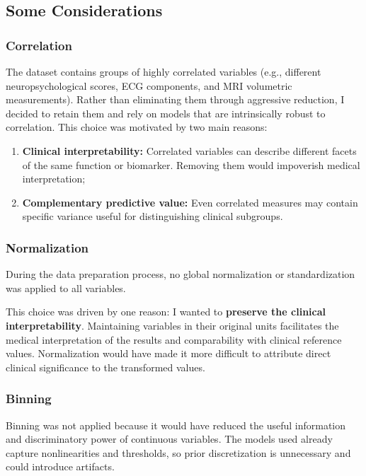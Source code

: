 \subsection{Some Considerations}
\subsubsection{Correlation}
The dataset contains groups of highly correlated variables (e.g., different neuropsychological scores, ECG components, and MRI volumetric measurements). Rather than eliminating them through aggressive reduction, I decided to retain them and rely on models that are intrinsically robust to correlation.
This choice was motivated by two main reasons:
\begin{enumerate}
	\item \textbf{Clinical interpretability:} Correlated variables can describe different facets of the same function or biomarker. Removing them would impoverish medical interpretation;
	\item \textbf{Complementary predictive value:} Even correlated measures may contain specific variance useful for distinguishing clinical subgroups.
\end{enumerate}

\subsubsection{Normalization}
During the data preparation process, no global normalization or standardization was applied to all variables. 

This choice was driven by one reason: I wanted to \textbf{preserve the clinical interpretability}. Maintaining variables in their original units facilitates the medical interpretation of the results and comparability with clinical reference values. Normalization would have made it more difficult to attribute direct clinical significance to the transformed values.

\subsubsection{Binning}
Binning was not applied because it would have reduced the useful information and discriminatory power of continuous variables. The models used already capture nonlinearities and thresholds, so prior discretization is unnecessary and could introduce artifacts.

